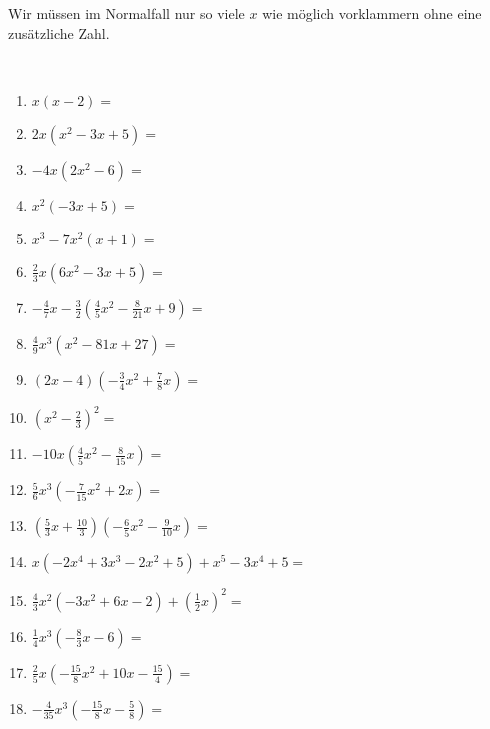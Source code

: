 Wir müssen im Normalfall nur so viele \(x\) wie möglich vorklammern ohne eine zusätzliche Zahl.
\newpage
\begin{Exercise}[title={Löse die Klammern auf und fasse soweit wie möglich zusammen}, label=aufloesenA1]\\
	\begin{minipage}{\textwidth}
		\begin{minipage}{0.44\textwidth}
			\begin{enumerate}[label=\alph*)]
				\item \(x\left( x-2\right) =\)
				\item \(2x\left( x^2-3x+5\right) =\)
				\item \(-4x\left( 2x^2-6\right) =\)
				\item \(x^2\left( -3x+5\right) =\)
				\item \(x^3-7x^2\left( x+1\right) =\)
				\item \(\frac{2}{3}x\left(6x^2-3x+5\right) =\)
				\item \(-\frac{4}{7}x-\frac{3}{2}\left(\frac{4}{5}x^2-\frac{8}{21}x+9\right) =\)
				\item \(\frac{4}{9}x^3\left(x^2-81x+27\right) =\)
				\item \(\left(2x-4\right) \left(-\frac{3}{4}x^2+\frac{7}{8}x\right) =\)
				\item \(\left(x^2-\frac{2}{3}\right) ^2=\)
				\item \(-10x\left(\frac{4}{5}x^2-\frac{8}{15}x\right) =\)
				\item \(\frac{5}{6}x^3\left(-\frac{7}{15}x^2+2x\right) =\)
				\item \(\left(\frac{5}{3}x+\frac{10}{3}\right)\left(-\frac{6}{5}x^2-\frac{9}{10}x \right) =\)
			\end{enumerate}
		\end{minipage}
		\begin{minipage}{0.54\textwidth}
			\begin{enumerate}[label=\alph*)]
				\setcounter{enumi}{13}
				\item \(x\left(-2x^4+3x^3-2x^2+5 \right)+x^5-3x^4+5 =\)
				\item \(\frac{4}{3}x^2\left( -3x^2+6x-2\right) +\left( \frac{1}{2}x\right) ^2=\)
				\item \(\frac{1}{4}x^3\left(-\frac{8}{3}x-6 \right) =\)
				\item \(\frac{2}{5}x\left(-\frac{15}{8}x^2+10x-\frac{15}{4} \right) =\)
				\item \(-\frac{4}{35}x^3\left(-\frac{15}{8}x- \frac{5}{8}\right) =\)

\end{enumerate}
\end{minipage}
\end{minipage}
\end{Exercise}
